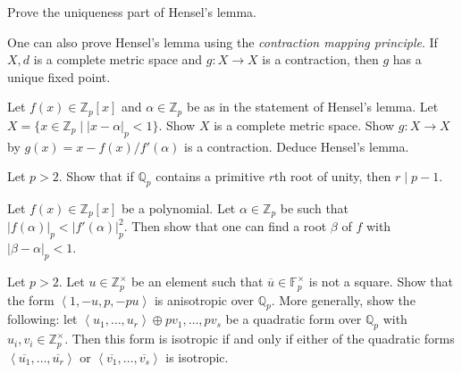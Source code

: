\documentclass[12 pt, letterpaper]{hmcpset}
\begin{document}

\begin{problem}[(1)]
	Prove the uniqueness part of Hensel's lemma.
\end{problem}

\begin{problem}[(2)]
	One can also prove Hensel's lemma using the \emph{contraction mapping principle}. If $X, d$ is a complete metric space and $g : X \to X$ is a contraction, then $g$ has a unique fixed point.

	Let $f(x) \in \mathbb{Z}_{p}[x]$ and $\alpha \in \mathbb{Z}_{p}$ be as in the statement of Hensel's lemma. Let $X = \{ x \in \mathbb{Z}_{p} \mid \lvert x - \alpha \rvert_{p} < 1 \}$. Show $X$ is a complete metric space. Show  $g : X \to X$ by $g(x) = x - f(x) / f'(\alpha)$ is a contraction. Deduce Hensel's lemma.
\end{problem}

\begin{problem}[(3)]
	Let $p > 2$. Show that if $\mathbb{Q}_{p}$ contains a primitive $r$th root of unity, then $r \mid p - 1$.
\end{problem}

\begin{problem}[(4)]
	Let $f(x) \in \mathbb{Z}_{p}[x]$ be a polynomial. Let $\alpha \in \mathbb{Z}_{p}$ be such that $\lvert f(\alpha) \rvert_{p} < \lvert f'(\alpha) \rvert_{p}^{2}$. Then show that one can find a root $\beta$ of $f$ with $\lvert \beta - \alpha \rvert_{p} < 1$.
\end{problem}

\pagebreak


\begin{problem}[(1)]
	Let $p > 2$. Let $u \in \mathbb{Z}_{p}^{\times}$ be an element such that $\overline{u} \in \mathbb{F}_{p}^{\times}$ is not a square. Show that the form $\left < 1, -u, p, -pu \right >$ is anisotropic over $\mathbb{Q}_{p}$. More generally, show the following: let $\left < u_{1}, \dots, u_{r} \right > \oplus p v_{1}, \dots, p v_{s}$ be a quadratic form over $\mathbb{Q}_{p}$ with $u_{i}, v_{i} \in \mathbb{Z}_{p}^{\times}$. Then this form is isotropic if and only if either of the quadratic forms $\left < \overline{u_{1}}, \dots, \overline{u_{r}} \right >$ or $\left < \overline{v_{1}}, \dots, \overline{v_{s}} \right >$ is isotropic.
\end{problem}
\end{document}
